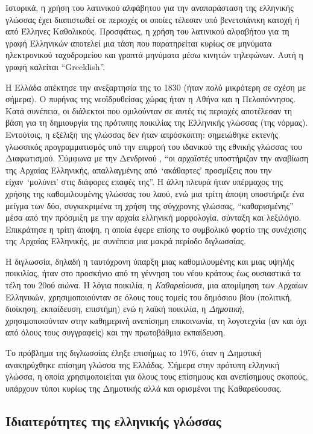 \documentclass[]{../../metanetpaper}
\begin{document}
\begin{multicols}{2}
Ιστορικά, η χρήση του λατινικού αλφάβητου για την αναπαράσταση της ελληνικής γλώσσας έχει διαπιστωθεί σε περιοχές οι οποίες τέλεσαν υπό βενετσιάνικη κατοχή ή από Έλληνες Καθολικούς. Προσφάτως, η χρήση του λατινικού αλφαβήτου για τη γραφή Ελληνικών αποτελεί μια τάση που παρατηρείται κυρίως σε μηνύματα ηλεκτρονικού ταχυδρομείου και γραπτά μηνύματα μέσω κινητών τηλεφώνων. Αυτή η γραφή καλείται “Greeklish”.


Η Ελλάδα απέκτησε την ανεξαρτησία της το 1830 (ήταν πολύ μικρότερη σε σχέση με σήμερα). Ο πυρήνας της νεοϊδρυθείσας χώρας ήταν η Αθήνα και η Πελοπόννησος. Κατά συνέπεια, οι διάλεκτοι που ομιλούνταν σε αυτές τις περιοχές αποτέλεσαν τη βάση για τη δημιουργία της πρότυπης ποικιλίας της Ελληνικής γλώσσας (της νόρμας).  Εντούτοις, η εξέλιξη της γλώσσας δεν ήταν απρόσκοπτη: σημειώθηκε εκτενής γλωσσικός προγραμματισμός υπό την επιρροή του ιδανικού της εθνικής γλώσσας του Διαφωτισμού. Σύμφωνα με την Δενδρινού \cite{Dend1}, “οι αρχαϊστές υποστήριζαν την αναβίωση της Αρχαίας Ελληνικής, απαλλαγμένης από~`ακάθαρτες' προσμίξεις που την είχαν~`μολύνει' στις διάφορες επαφές της”. Η άλλη πλευρά ήταν υπέρμαχος της χρήσης της καθομιλουμένης γλώσσας του λαού, ενώ μια τρίτη άποψη υποστήριζε ένα μείγμα των δύο, συγκεκριμένα τη χρήση της σύγχρονης γλώσσας, “καθαρισμένης” μέσα από την πρόσμιξη με την αρχαία ελληνική μορφολογία, σύνταξη και λεξιλόγιο. Επικράτησε η τρίτη άποψη, η οποία έφερε επίσης το συμβολικό φορτίο της συνέχισης της Αρχαίας Ελληνικής, με συνέπεια μια μακρά περίοδο διγλωσσίας.

Η διγλωσσία, δηλαδή η ταυτόχρονη ύπαρξη μιας καθομιλουμένης και μιας υψηλής ποικιλίας, ήταν στο προσκήνιο από τη γέννηση του νέου κράτους έως ουσιαστικά τα τέλη του 20ού αιώνα. Η λόγια ποικιλία, η  \textit{Καθαρεύουσα}, μια απομίμηση των Αρχαίων Ελληνικών, χρησιμοποιούνταν σε όλους τους τομείς του δημόσιου βίου (πολιτική, διοίκηση, εκπαίδευση, επιστήμη) ενώ η λαϊκή ποικιλία, η  \textit{Δημοτική}, χρησιμοποιούνταν στην καθημερινή ανεπίσημη επικοινωνία, τη λογοτεχνία (αν και όχι από όλους τους συγγραφείς) και την πρωτοβάθμια εκπαίδευση.

Το πρόβλημα της διγλωσσίας έληξε επισήμως το 1976, όταν η Δημοτική ανακηρύχθηκε επίσημη γλώσσα της Ελλάδας. Σήμερα στην πρότυπη ελληνική γλώσσα, η οποία χρησιμοποιείται για όλους τους επίσημους και ανεπίσημους σκοπούς, υπάρχουν τύποι κυρίως της Δημοτικής αλλά και ορισμένοι της Καθαρεύουσας.

\subsection{Ιδιαιτερότητες της ελληνικής γλώσσας}


\end{multicols}
\end{document}
